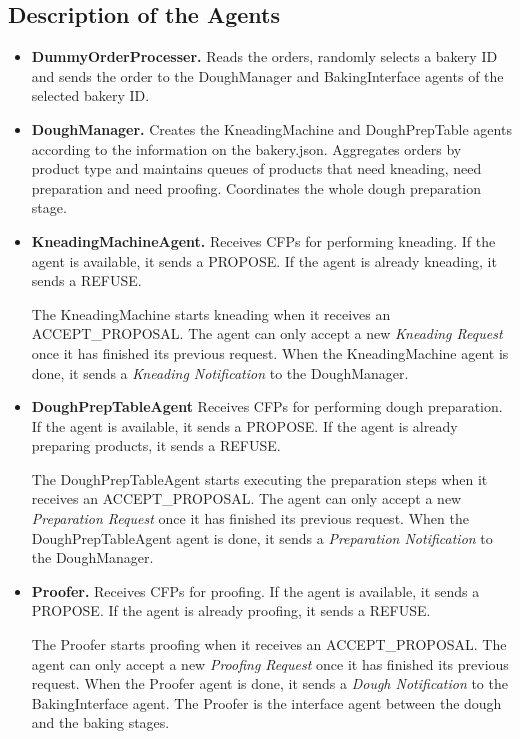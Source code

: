 \documentclass[paper=a4, fontsize=11pt]{scrartcl}
\begin{document}
	\subsection{Description of the Agents}

	\begin{itemize}
		\item \textbf{DummyOrderProcesser.} Reads the orders, randomly selects a bakery ID and sends the order to the DoughManager and BakingInterface agents of the selected bakery ID. \\

		\item \textbf{DoughManager.} Creates the KneadingMachine and DoughPrepTable agents according to the information on the bakery.json. Aggregates orders by product type and maintains queues of products that need kneading, need preparation and need proofing. Coordinates the whole dough preparation stage.  \\

		\item \textbf{KneadingMachineAgent.} Receives CFPs for performing kneading. If the agent is available, it sends a PROPOSE. If the agent is already kneading, it sends a REFUSE.

		The KneadingMachine starts kneading when it receives an ACCEPT\_PROPOSAL. The agent can only accept a new \textit{Kneading Request} once it has finished its previous request. When the KneadingMachine agent is done, it sends a \textit{Kneading Notification} to the DoughManager. \\

		\item \textbf{DoughPrepTableAgent} Receives CFPs for performing dough preparation. If the agent is available, it sends a PROPOSE. If the agent is already preparing products, it sends a REFUSE.

		The DoughPrepTableAgent starts executing the preparation steps when it receives an ACCEPT\_PROPOSAL. The agent can only accept a new \textit{Preparation Request} once it has finished its previous request. When the DoughPrepTableAgent agent is done, it sends a \textit{Preparation Notification} to the DoughManager.

		\item \textbf{Proofer.} Receives CFPs for proofing. If the agent is available, it sends a PROPOSE. If the agent is already proofing, it sends a REFUSE.

		The Proofer starts proofing when it receives an ACCEPT\_PROPOSAL. The agent can only accept a new \textit{Proofing Request} once it has finished its previous request. When the Proofer agent is done, it sends a \textit{Dough Notification} to the BakingInterface agent. The Proofer is the interface agent between the dough and the baking stages. \\


\end{itemize}
\end{document}
